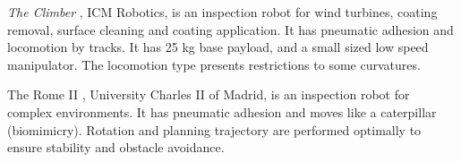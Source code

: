 


\emph{The Climber}%
, ICM Robotics, is an inspection robot for
wind turbines, coating removal, surface cleaning and coating application.
It has pneumatic adhesion and locomotion by tracks. It has 25 kg base payload,
and a small sized low speed manipulator. The locomotion type presents
restrictions to some curvatures.



The Rome II%
, University Charles II of Madrid, is an inspection robot for complex
environments. It has pneumatic adhesion and moves like a caterpillar
(biomimicry). Rotation and planning trajectory are performed optimally to
ensure stability and obstacle avoidance.

